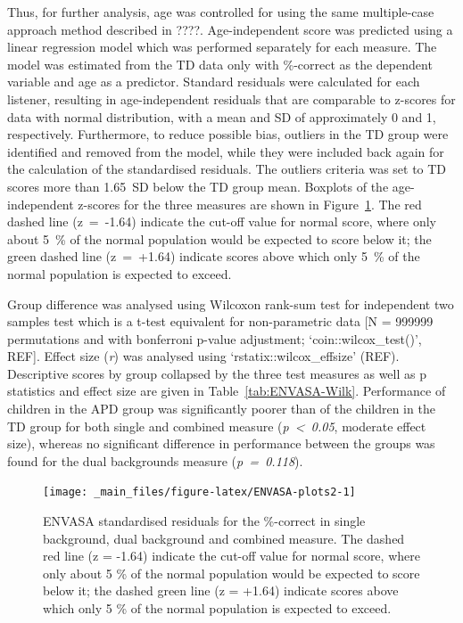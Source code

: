 \documentclass[a4paper, twoside]{templates/ociamthesis}
\begin{document}
Thus, for further analysis, age was controlled for using the same multiple-case approach method described in ????. Age-independent score was predicted using a linear regression model which was performed separately for each measure. The model was estimated from the TD data only with \%-correct as the dependent variable and age as a predictor. Standard residuals were calculated for each listener, resulting in age-independent residuals that are comparable to z-scores for data with normal distribution, with a mean and SD of approximately 0 and 1, respectively. Furthermore, to reduce possible bias, outliers in the TD group were identified and removed from the model, while they were included back again for the calculation of the standardised residuals. The outliers criteria was set to TD scores more than 1.65~SD below the TD group mean. Boxplots of the age-independent z-scores for the three measures are shown in Figure~\ref{fig:ENVASA-plots2}. The red dashed line (z~=~-1.64) indicate the cut-off value for normal score, where only about 5~\% of the normal population would be expected to score below it; the green dashed line (z~=~+1.64) indicate scores above which only 5~\% of the normal population is expected to exceed.

Group difference was analysed using Wilcoxon rank-sum test for independent two samples test which is a t-test equivalent for non-parametric data {[}N = 999999 permutations and with bonferroni p-value adjustment; `coin::wilcox\_test()', REF{]}. Effect size (\emph{r}) was analysed using `rstatix::wilcox\_effsize' (REF). Descriptive scores by group collapsed by the three test measures as well as p statistics and effect size are given in Table~\ref{tab:ENVASA-Wilk}. Performance of children in the APD group was significantly poorer than of the children in the TD group for both single and combined measure (\emph{p~\textless~0.05}, moderate effect size), whereas no significant difference in performance between the groups was found for the dual backgrounds measure (\emph{p~=~0.118}).

\begin{figure}

{\centering \texttt{[image: \_main\_files/figure-latex/ENVASA-plots2-1]} 

}

\caption{ENVASA standardised residuals for the \%-correct in single background, dual background and combined measure. The dashed red line (z = -1.64) indicate the cut-off value for normal score, where only about 5 \% of the normal population would be expected to score below it; the dashed green line (z = +1.64) indicate scores above which only 5 \% of the normal population is expected to exceed.}\label{fig:ENVASA-plots2}
\end{figure}
\end{document}
